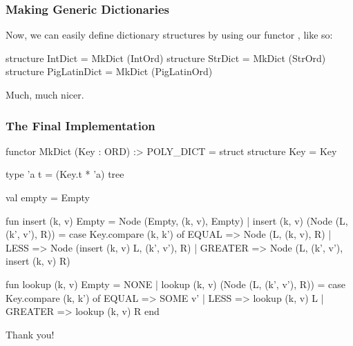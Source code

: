 \documentclass[aspectratio=169]{beamer}
\begin{document}
\begin{frame}[fragile]
  \frametitle{Making Generic Dictionaries}

  Now, we can easily define dictionary structures by using our functor
  , like so:

  \begin{codeblock}
    structure IntDict      = MkDict (IntOrd)
    structure StrDict      = MkDict (StrOrd)
    structure PigLatinDict = MkDict (PigLatinOrd)
  \end{codeblock}

  Much, much nicer.
\end{frame}

\begin{frame}[fragile]
  \frametitle{The Final Implementation}

  \tiny
  \begin{codeblock}
    functor MkDict (Key : ORD) :> POLY_DICT =
      struct
        structure Key = Key

        type 'a t = (Key.t * 'a) tree

        val empty = Empty

        fun insert (k, v) Empty = Node (Empty, (k, v), Empty) 
          | insert (k, v) (Node (L, (k', v'), R)) =
              case Key.compare (k, k') of
                EQUAL   => Node (L, (k, v), R)
              | LESS    => Node (insert (k, v) L, (k', v'), R)
              | GREATER => Node (L, (k', v'), insert (k, v) R) 

        fun lookup (k, v) Empty = NONE 
          | lookup (k, v) (Node (L, (k', v'), R)) =
              case Key.compare (k, k') of
                EQUAL   => SOME v' 
              | LESS    => lookup (k, v) L
              | GREATER => lookup (k, v) R
      end
  \end{codeblock}


\end{frame}






\begin{frame}[plain]
	\begin{center} Thank you! \end{center}
\end{frame}
\end{document}
